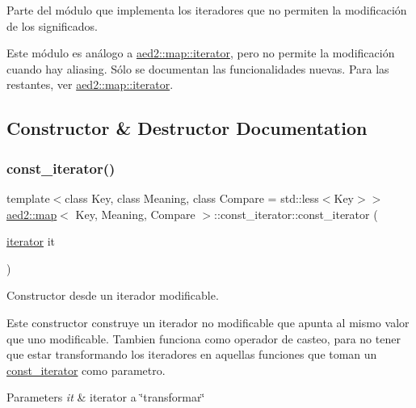 Parte del módulo que implementa los iteradores que no permiten la modificación de los significados. 

Este módulo es análogo a \hyperlink{classaed2_1_1map_1_1iterator}{aed2\+::map\+::iterator}, pero no permite la modificación cuando hay aliasing. Sólo se documentan las funcionalidades nuevas. Para las restantes, ver \hyperlink{classaed2_1_1map_1_1iterator}{aed2\+::map\+::iterator}. 

\subsection{Constructor \& Destructor Documentation}
\mbox{\label{classaed2_1_1map_1_1const__iterator_ab7924d90cbf6d19bec62514d10b62fb3}} 
\subsubsection{\texorpdfstring{const\+\_\+iterator()}{const\_iterator()}}
{\footnotesize\ttfamily template$<$class Key, class Meaning, class Compare = std\+::less$<$\+Key$>$$>$ \\
\hyperlink{classaed2_1_1map}{aed2\+::map}$<$ Key, Meaning, Compare $>$\+::const\+\_\+iterator\+::const\+\_\+iterator (\begin{DoxyParamCaption}\item[{\hyperlink{classaed2_1_1map_1_1iterator}{iterator}}]{it }\end{DoxyParamCaption})\hspace{0.3cm}{\ttfamily [inline]}}



Constructor desde un iterador modificable. 

Este constructor construye un iterador no modificable que apunta al mismo valor que uno modificable. Tambien funciona como operador de casteo, para no tener que estar transformando los iteradores en aquellas funciones que toman un {\ttfamily \hyperlink{classaed2_1_1map_1_1const__iterator}{const\+\_\+iterator}} como parametro.


\begin{DoxyParams}{Parameters}
{\em it} & iterator a \char`\"{}transformar\char`\"{} \\
\hline
\end{DoxyParams}

